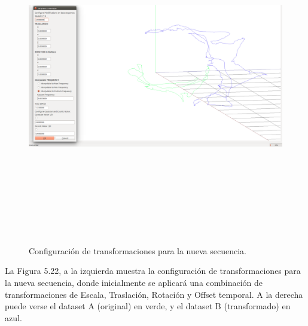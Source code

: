 \begin{figure}[H]
\begin{center}
\label{fig:opciones de View}\includegraphics[height=14.0cm,width=18.0cm]{img/cap6/newData_Transformations.png}
\hspace{0.5cm}

\end{center}

\caption{ Configuración de transformaciones para la nueva secuencia.}
\end{figure}
La Figura 5.22, a la izquierda muestra la configuración de transformaciones para la nueva secuencia, donde inicialmente se aplicará una combinación de transformaciones de Escala, Traslación, Rotación y Offset temporal. A la derecha puede verse el dataset A (original) en verde, y el dataset B (transformado) en azul.


